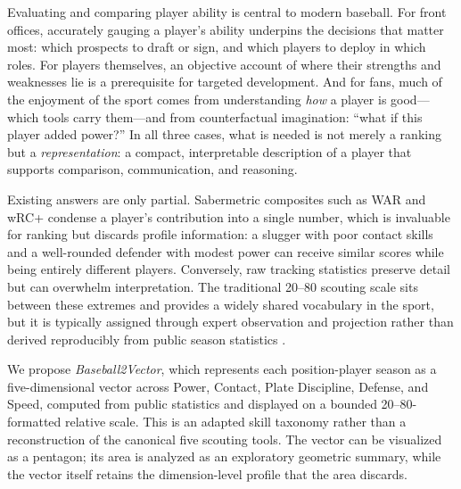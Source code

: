 \documentclass[10pt,twocolumn,letterpaper]{article}
\begin{document}
Evaluating and comparing player ability is central to modern baseball. For front offices, accurately gauging a player's ability underpins the decisions that matter most: which prospects to draft or sign, and which players to deploy in which roles. For players themselves, an objective account of where their strengths and weaknesses lie is a prerequisite for targeted development. And for fans, much of the enjoyment of the sport comes from understanding \emph{how} a player is good---which tools carry them---and from counterfactual imagination: ``what if this player added power?'' In all three cases, what is needed is not merely a ranking but a \emph{representation}: a compact, interpretable description of a player that supports comparison, communication, and reasoning.

Existing answers are only partial. Sabermetric composites such as WAR and wRC+ condense a player's contribution into a single number, which is invaluable for ranking but discards profile information: a slugger with poor contact skills and a well-rounded defender with modest power can receive similar scores while being entirely different players. Conversely, raw tracking statistics preserve detail but can overwhelm interpretation. The traditional 20--80 scouting scale sits between these extremes and provides a widely shared vocabulary in the sport, but it is typically assigned through expert observation and projection rather than derived reproducibly from public season statistics \cite{mcdaniel2014}.

We propose \emph{Baseball2Vector}, which represents each position-player season as a five-dimensional vector across Power, Contact, Plate Discipline, Defense, and Speed, computed from public statistics and displayed on a bounded 20--80-formatted relative scale. This is an adapted skill taxonomy rather than a reconstruction of the canonical five scouting tools. The vector can be visualized as a pentagon; its area is analyzed as an exploratory geometric summary, while the vector itself retains the dimension-level profile that the area discards.
\end{document}
